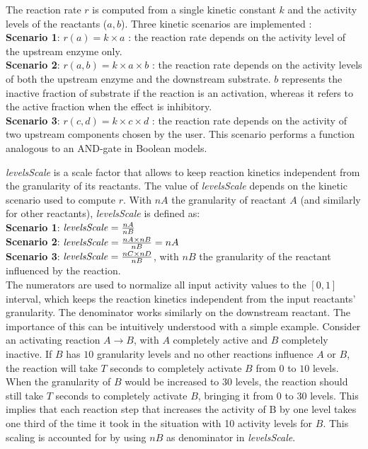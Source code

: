 \documentclass[journal, 10pt]{IEEEtran}
\begin{document}
The reaction rate $r$ is computed from a single kinetic constant $k$ and the activity levels of the reactants ($a, b$). Three kinetic scenarios are implemented :\\
{\bf Scenario 1}: $r(a) = k \times a$ : the reaction rate depends on the activity level of the upstream enzyme only. \\
{\bf Scenario 2}: $r(a, b) = k \times a \times b$ : the reaction rate depends on the activity levels of both the upstream enzyme and the
downstream substrate. $b$ represents the inactive fraction of substrate if the reaction
is an activation, whereas it refers to the active fraction when the effect is inhibitory.\\
{\bf Scenario 3}: $r(c, d) = k \times c \times d$ : the reaction rate depends on the activity of two upstream components chosen by the user. This scenario performs a function analogous to an AND-gate in Boolean models.

{\it levelsScale} is a scale factor that allows to keep reaction kinetics independent from the granularity of its reactants. 
The value of {\it levelsScale} depends on the kinetic scenario used to compute $r$. With $nA$ the granularity of reactant $A$
(and similarly for other reactants), {\it levelsScale} is defined as:\\
{\bf Scenario 1}: $\mbox{\it levelsScale} = \frac{nA}{nB}$\\[1ex]
{\bf Scenario 2}: $\mbox{\it levelsScale} = \frac{nA \times nB}{nB} = nA$\\[1ex]
{\bf Scenario 3}: $\mbox{\it levelsScale} = \frac{nC \times nD}{nB}$, with $nB$ the granularity of the reactant influenced by the reaction.\\
The numerators are used to normalize all input activity values to the $[0, 1]$ interval, which keeps the reaction
kinetics independent from the input reactants' granularity. The denominator works similarly on the downstream reactant.
The importance of this can be intuitively understood with a simple example.
Consider an activating reaction $A \rightarrow B$, with $A$ completely
active and $B$ completely inactive. If $B$ has $10$ granularity levels and no other reactions influence $A$ or $B$,
the reaction will take $T$ seconds to completely activate $B$ from $0$ to $10$ levels. When the granularity of $B$ would be increased to
$30$ levels, the reaction should still take $T$ seconds to completely activate $B$, bringing it
from $0$ to $30$ levels. This implies that each reaction step that increases the activity of B by one level takes one third 
of the time it took in the situation with 10 activity levels for $B$. This scaling is accounted for by using $nB$ as denominator in {\it levelsScale}.
\end{document}
